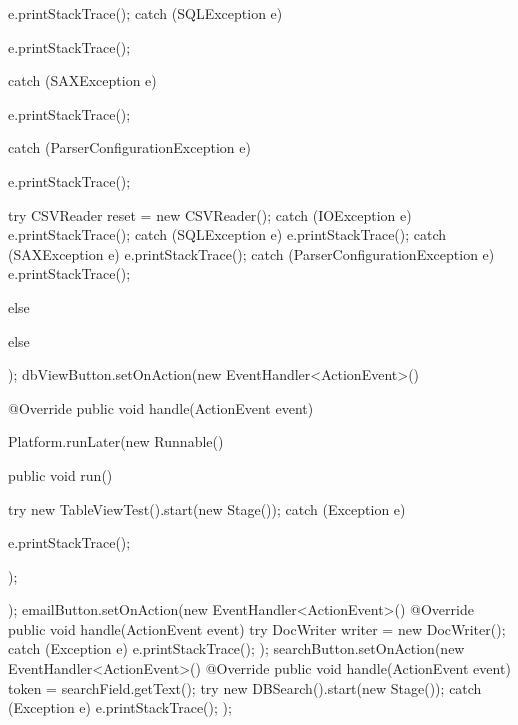 \begin{pyglist}[language=java,style=borland,numbers=left,numbersep=5pt]
{{{{{{{                            e.printStackTrace();
                        } catch (SQLException e) {

                            e.printStackTrace();
                        } catch (SAXException e) {

                            e.printStackTrace();
                        } catch (ParserConfigurationException e) {

                            e.printStackTrace();
                        }
                        try {
                            CSVReader reset = new CSVReader();
                        } catch (IOException e) {
                            e.printStackTrace();
                        } catch (SQLException e) {
                            e.printStackTrace();
                        } catch (SAXException e) {
                            e.printStackTrace();
                        } catch (ParserConfigurationException e) {
                            e.printStackTrace();
                        }
                    } else {

                    }
                } else {

                }

            }
        });
        dbViewButton.setOnAction(new EventHandler<ActionEvent>() {
            @Override
            public void handle(ActionEvent event) {
                Platform.runLater(new Runnable() {
                    public void run() {
                        try {
                            new TableViewTest().start(new Stage());
                        } catch (Exception e) {

                            e.printStackTrace();
                        }

                    }
                });
            }

        });
        emailButton.setOnAction(new EventHandler<ActionEvent>() {
            @Override
            public void handle(ActionEvent event) {
                try {
                    DocWriter writer = new DocWriter();
                } catch (Exception e) {
                    e.printStackTrace();
                }
            }
        });
        searchButton.setOnAction(new EventHandler<ActionEvent>() {
            @Override
            public void handle(ActionEvent event) {
                token = searchField.getText();
                try {
                    new DBSearch().start(new Stage());
                } catch (Exception e) {
                    e.printStackTrace();
                }
            }
        });

}}
\end{pyglist}
